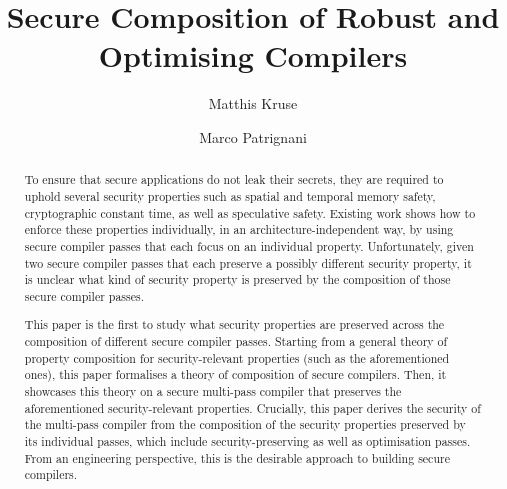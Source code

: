 \documentclass[acmsmall]{acmart}
\theoremstyle{definition}
\begin{document}
\linenumbers
\title{
  Secure Composition of Robust and Optimising Compilers
}

\author{Matthis Kruse}
\author{Marco Patrignani}
\renewcommand{\shortauthors}{Kruse and Patrignani}

\begin{abstract}
To ensure that secure applications do not leak their secrets, they are required to uphold several security properties such as spatial and temporal memory safety, cryptographic constant time, as well as speculative safety.
Existing work shows how to enforce these properties individually, in an architecture-independent way, by using secure compiler passes that each focus on an individual property.
Unfortunately, given two secure compiler passes that each preserve a possibly different security property, it is unclear what kind of security property is preserved by the composition of those secure compiler passes.

This paper is the first to study what security properties are preserved across the composition of different secure compiler passes.
Starting from a general theory of property composition for security-relevant properties (such as the aforementioned ones), this paper formalises a theory of composition of secure compilers.
Then, it showcases this theory on a secure multi-pass compiler that preserves the aforementioned security-relevant properties.
Crucially, this paper derives the security of the multi-pass compiler from the composition of the security properties preserved by its individual passes, which include security-preserving as well as optimisation passes.
% 
From an engineering perspective, this is the desirable approach to building secure compilers.
\end{abstract}
\end{document}
